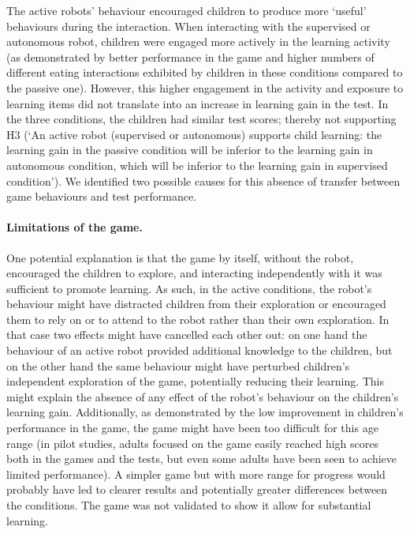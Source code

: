 The active robots' behaviour encouraged children to produce more `useful' behaviours during the interaction. When interacting with the supervised or autonomous robot, children were engaged more actively in the learning activity (as demonstrated by better performance in the game and higher numbers of different eating interactions exhibited by children in these conditions compared to the passive one). However, this higher engagement in the activity and exposure to learning items did not translate into an increase in learning gain in the test. In the three conditions, the children had similar test scores; thereby not supporting H3 (`An active robot (supervised or autonomous) supports child learning: the learning gain in the passive condition will be inferior to the learning gain in autonomous condition, which will be inferior to the learning gain in supervised condition'). We identified two possible causes for this absence of transfer between game behaviours and test performance. 

\paragraph{Limitations of the game.} One potential explanation is that the game by itself, without the robot, encouraged the children to explore, and interacting independently with it was sufficient to promote learning. As such, in the active conditions, the robot's behaviour might have distracted children from their exploration or encouraged them to rely on or to attend to the robot rather than their own exploration. In that case two effects might have cancelled each other out: on one hand the behaviour of an active robot provided additional knowledge to the children, but on the other hand the same behaviour might have perturbed children's independent exploration of the game, potentially reducing their learning. This might explain the absence of any effect of the robot's behaviour on the children's learning gain. Additionally, as demonstrated by the low improvement in children's performance in the game, the game might have been too difficult for this age range (in pilot studies, adults focused on the game easily reached high scores both in the games and the tests, but even some adults have been seen to achieve limited performance). A simpler game but with more range for progress would probably have led to clearer results and potentially greater differences between the conditions. The game was not validated to show it allow for substantial learning.


